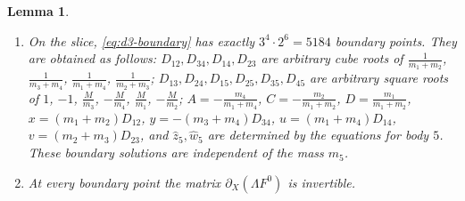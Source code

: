 \documentclass[Threeside,11pt]{article}
\newtheorem{lemma}[theorem]{Lemma}
\theoremstyle{definition}
\theoremstyle{remark}
\numberwithin{equation}{section}
\theoremstyle{remark}
\newenvironment{alphalist}{\begin{enumerate}\renewcommand{\labelenumi}{(\alph{enumi})}%
  \renewcommand{\theenumi}{\alph{enumi}}}{\end{enumerate}}
\begin{document}
{\begin{lemma}\label{lem:d3-fibre}
\begin{alphalist}
  \item On the slice, \eqref{eq:d3-boundary} has exactly $3^4\cdot2^6=5184$ boundary points.
  They are obtained as follows: $D_{12},D_{34},D_{14},D_{23}$ are arbitrary cube roots of $\frac1{m_1+m_2}$,
  $\frac1{m_3+m_4}$, $\frac1{m_1+m_4}$, $\frac1{m_2+m_3}$; $D_{13},D_{24},D_{15},D_{25},D_{35},
  D_{45}$ are arbitrary square roots of $1$, $-1$, $\frac M{m_3}$, $-\frac M{m_4}$, $\frac M{m_1}$,
  $-\frac M{m_2}$; $A=-\frac{m_4}{m_1+m_4}$, $C=-\frac{m_2}{m_1+m_2}$, $D=\frac{m_1}{m_1+m_2}$,
  $x=(m_1+m_2)D_{12}$, $y=-(m_3+m_4)D_{34}$, $u=(m_1+m_4)D_{14}$, $v=(m_2+m_3)D_{23}$, and
  $\hat z_5,\hat w_5$ are determined by the equations for body $5$. These boundary solutions
  are independent of the mass $m_5$.
\item At every boundary point the matrix $\partial_X(\Lambda F^0)$ is invertible.

\end{alphalist}
\end{lemma}}
\end{document}
